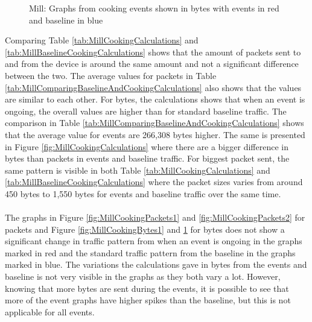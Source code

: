\begin{figure}[H]
\begin{subfigure}[b]{0.47\textwidth}
    \end{subfigure}
        \begin{subfigure}[b]{0.47\textwidth}
        \centering
    \end{subfigure}
    \begin{subfigure}[b]{0.47\textwidth}
        \centering
    \end{subfigure}
    \begin{subfigure}[b]{0.47\textwidth}
        \centering
    \end{subfigure}
    \hspace{0.6cm}
    \begin{subfigure}[b]{0.47\textwidth}
    \centering
        \end{subfigure}
    \caption{Mill: Graphs from cooking events shown in bytes with events in red and baseline in blue}
    \label{fig:MillCookingBytes2}
\end{figure}

Comparing Table \ref{tab:MillCookingCalculations} and \ref{tab:MillBaselineCookingCalculations} shows that the amount of packets sent to and from the device is around the same amount and not a significant difference between the two. The average values for packets in Table \ref{tab:MillComparingBaselineAndCookingCalculations} also shows that the values are similar to each other. For bytes, the calculations shows that when an event is ongoing, the overall values are higher than for standard baseline traffic. The comparison in Table \ref{tab:MillComparingBaselineAndCookingCalculations} shows that the average value for events are 266,308 bytes higher. The same is presented in Figure \ref{fig:MillCookingCalculations} where there are a bigger difference in bytes than packets in events and baseline traffic. For biggest packet sent, the same pattern is visible in both Table \ref{tab:MillCookingCalculations} and \ref{tab:MillBaselineCookingCalculations} where the packet sizes varies from around 450 bytes to 1,550 bytes for events and baseline traffic over the same time. 
\\\\
The graphs in Figure \ref{fig:MillCookingPackets1} and \ref{fig:MillCookingPackets2} for packets and Figure \ref{fig:MillCookingBytes1} and \ref{fig:MillCookingBytes2} for bytes does not show a significant change in traffic pattern from when an event is ongoing in the graphs marked in red and the standard traffic pattern from the baseline in the graphs marked in blue. The variations the calculations gave in bytes from the events and baseline is not very visible in the graphs as they both vary a lot. However, knowing that more bytes are sent during the events, it is possible to see that more of the event graphs have higher spikes than the baseline, but this is not applicable for all events. 

